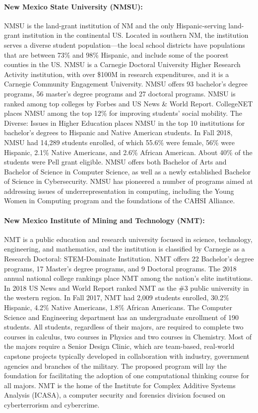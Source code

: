 \paragraph{New Mexico State University (NMSU):}
NMSU is the land-grant institution of NM and the only Hispanic-serving land-grant institution in the continental US. Located in southern NM, the institution serves a diverse student population---the local school districts have populations that are between 73\% and 98\% Hispanic, and include some of
the poorest counties in the US. NMSU is a Carnegie Doctoral University Higher Research Activity institution, with over \$100M in research expenditures, and it is a Carnegie Community Engagement University. NMSU offers 93 bachelor's degree programs, 56 master's degree programs and 27 doctoral programs. NMSU is ranked among top colleges by Forbes and US News \& World Report. CollegeNET places NMSU among the top 12\% for improving students’ social mobility. The Diverse: Issues in Higher Education places NMSU
in the top 10 institutions for bachelor’s degrees to Hispanic and Native American students. 
In Fall 2018, NMSU had 14,289 students enrolled, of which 55.6\% were female, 56\% were Hispanic, 2.1\%
Native Americans, and 2.6\% African American. About 40\% of the students were Pell grant eligible.
NMSU offers both Bachelor of Arts and Bachelor of Science in Computer Science, as well as a newly established Bachelor of Science in Cybersecurity.  NMSU has pioneered a number of programs aimed at addressing issues of underrepresentation in computing, including the Young Women in Computing program and the foundations of the CAHSI Alliance.

\paragraph{New Mexico Institute of Mining and Technology (NMT):}
NMT is a public education and research university focused in science, technology, engineering, and mathematics, and the institution is classified by Carnegie as a Research Doctoral: STEM-Dominate Institution. NMT offers 22 Bachelor’s degree programs, 17 Master’s degree programs, and 9 Doctoral programs. The 2018 annual national college rankings place NMT among the nation’s elite institutions. In 2018 US News and World Report ranked NMT as the \#3 public university in the western region. In Fall
2017, NMT had 2,009 students enrolled, 30.2\% Hispanic, 4.2\% Native Americans, 1.8\% African Americans.
The Computer Science and Engineering department has an undergraduate enrollment of 190 students. All
students, regardless of their majors, are required to complete two courses in calculus, two courses in
Physics and two courses in Chemistry. Most of the majors require a Senior Design Clinic, which are team-based,
real-world capstone projects typically developed in collaboration with industry, government agencies
and branches of the military. The proposed program will lay the foundation for facilitating the adoption of one computational thinking course for all majors. NMT is the home of the Institute for Complex Additive Systems Analysis (ICASA), a computer security and forensics division focused on cyberterrorism and cybercrime.



